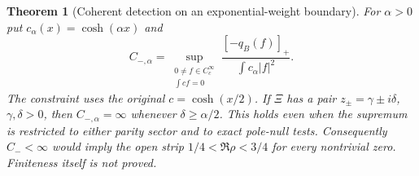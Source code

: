\documentclass[11pt]{article}
\newtheorem{theorem}{Theorem}
\theoremstyle{remark}\newtheorem{remark}[theorem]{Remark}
\begin{document}
\begin{theorem}[Coherent detection on an exponential-weight boundary]
\label{thm:heat-boundary-detection}
For $\alpha>0$ put $c_\alpha(x)=\cosh(\alpha x)$ and
\[
 C_{-,\alpha}=\sup_{\substack{0\ne f\in C_c^\infty\\\int cf=0}}
                         \frac{[-q_B(f)]_+}{\int c_\alpha|f|^2}.
                                                               \tag{HBC1}
\]
The constraint uses the original $c=\cosh(x/2)$.
If $\Xi$ has a pair $z_\pm=\gamma\pm i\delta$, $\gamma,\delta>0$,
then $C_{-,\alpha}=\infty$ whenever $\delta\ge\alpha/2$.
This holds even when the supremum is restricted to either
parity sector and to exact pole-null tests.
Consequently $C_-<\infty$ would imply the open strip
$1/4<\Re\rho<3/4$ for every nontrivial zero.
Finiteness itself is not proved.
\end{theorem}
\end{document}
